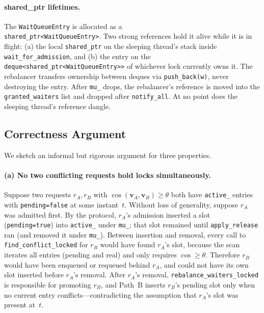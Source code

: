 \documentclass[sigconf]{acmart}
\begin{document}
\paragraph{shared\_ptr lifetimes.}
The \texttt{WaitQueueEntry} is allocated as a \\
\texttt{shared\_ptr<WaitQueueEntry>}. Two strong references hold it
alive while it is in flight: (a) the local
\texttt{shared\_ptr} on the sleeping thread's stack inside
\texttt{wait\_for\_admission}, and (b) the entry on the \\
\texttt{deque<shared\_ptr<WaitQueueEntry>>} of whichever lock currently
owns it. The rebalancer transfers ownership between deques via
\texttt{push\_back(w)}, never destroying the entry. After
\texttt{mu\_} drops, the rebalancer's reference is moved into the
\texttt{granted\_waiters} list and dropped after \texttt{notify\_all}.
At no point does the sleeping thread's reference dangle.

\subsection{Correctness Argument}
\label{sec:correctness}

We sketch an informal but rigorous argument for three properties.

\paragraph{\textbf{(a) No two conflicting requests hold locks
simultaneously.}}
Suppose two requests $r_A, r_B$ with
$\cos(\mathbf{v}_A,\mathbf{v}_B)\ge\theta$ both have
\texttt{active\_} entries with \texttt{pending=false} at some
instant~$t$. Without loss of generality, suppose $r_A$ was admitted
first. By the protocol, $r_A$'s admission inserted a slot
(\texttt{pending=true}) into \texttt{active\_} under \texttt{mu\_};
that slot remained until \texttt{apply\_release} ran (and removed it
under \texttt{mu\_}). Between insertion and removal, every call to
\texttt{find\_conflict\_locked} for $r_B$ would have found
$r_A$'s slot, because the scan iterates all entries (pending and
real) and only requires $\cos\ge\theta$. Therefore $r_B$ would have
been enqueued or requeued behind $r_A$, and could not have its own
slot inserted before $r_A$'s removal. After $r_A$'s removal,
\texttt{rebalance\_waiters\_locked} is responsible for promoting $r_B$,
and Path~B inserts $r_B$'s pending slot only when no current entry
conflicts---contradicting the assumption that $r_A$'s slot was
present at~$t$.
\end{document}
